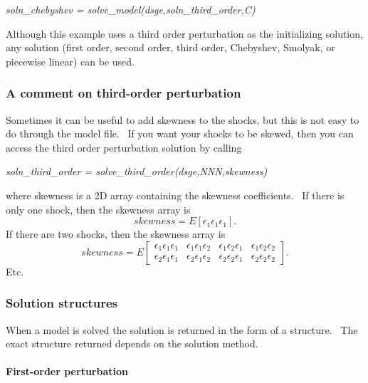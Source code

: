 \documentclass[notitlepage,11pt]{article}
\begin{document}
\textit{soln\_chebyshev = solve\_model(dsge,soln\_third\_order,C)}

\bigskip

Although this example uses a third order perturbation as the initializing
solution, any solution (first order, second order, third order, Chebyshev,
Smolyak, or piecewise linear) can be used.

\subsubsection{A comment on third-order perturbation}

Sometimes it can be useful to add skewness to the shocks, but this is not
easy to do through the model file. \ If you want your shocks to be skewed,
then you can access the third order perturbation solution by calling

\bigskip

\textit{soln\_third\_order = solve\_third\_order(dsge,NNN,skewness)}

\bigskip

where skewness is a 2D array containing the skewness coefficients. \ If
there is only one shock, then the skewness array is%
\begin{equation*}
skewness=E\left[ \epsilon _{1}\epsilon _{1}\epsilon _{1}\right] .
\end{equation*}%
If there are two shocks, then the skewness array is%
\begin{equation*}
skewness=E\left[ 
\begin{array}{cccc}
\epsilon _{1}\epsilon _{1}\epsilon _{1} & \epsilon _{1}\epsilon _{1}\epsilon
_{2} & \epsilon _{1}\epsilon _{2}\epsilon _{1} & \epsilon _{1}\epsilon
_{2}\epsilon _{2} \\ 
\epsilon _{2}\epsilon _{1}\epsilon _{1} & \epsilon _{2}\epsilon _{1}\epsilon
_{2} & \epsilon _{2}\epsilon _{2}\epsilon _{1} & \epsilon _{2}\epsilon
_{2}\epsilon _{2}%
\end{array}%
\right] .
\end{equation*}%
Etc.

\subsubsection{Solution structures}

When a model is solved the solution is returned in the form of a structure.
\ The exact structure returned depends on the solution method.

\paragraph{First-order perturbation}
\end{document}
